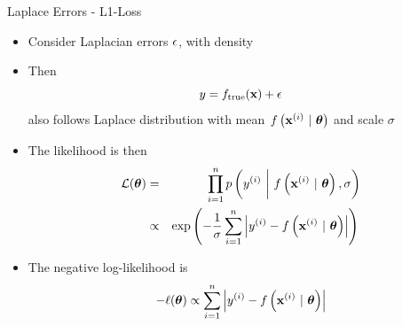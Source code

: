 \documentclass[11pt,compress,t,notes=noshow, xcolor=table]{beamer}
\begin{document}
\begin{vbframe}{Laplace Errors - L1-Loss}

\begin{itemize}
    \item Consider Laplacian errors $\epsilon$, with density 
\end{itemize}
\lz

\begin{itemize}
\item Then
$$
y = f_{\text{true}}(\mathbf{x}) + \epsilon 
$$
also follows Laplace distribution with mean $f\left(\mathbf{x}^{(i)} ~|~ \bm{\theta}\right)$ and scale  $\sigma$ 
\end{itemize}
\framebreak 

\begin{itemize}
    \item The likelihood is then 
\begin{eqnarray*}
\mathcal{L}(\bm{\theta}) &=& \prod_{i=1}^n p\left(y^{(i)} ~\bigg|~ f\left(\mathbf{x}^{(i)} ~|~ \bm{\theta}\right), \sigma\right) \\ &\propto& \exp\left(-\frac{1}{\sigma}\sum\limits_{i=1}^n \left|y^{(i)} - f\left(\mathbf{x}^{(i)} ~|~ \bm{\theta}\right)\right|\right)\,
\end{eqnarray*}
\item The negative log-likelihood is
$$
- \ell(\bm{\theta}) \propto \sum\limits_{i=1}^n \left|y^{(i)} - f\left(\mathbf{x}^{(i)} ~|~ \bm{\theta}\right)\right|
$$


\end{itemize}
\end{vbframe}
\end{document}
